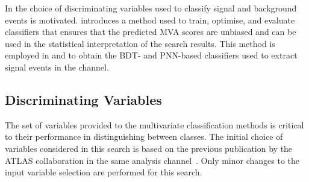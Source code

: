 In  the choice of discriminating
variables used to classify signal and background events is
motivated.  introduces a method used to train,
optimise, and evaluate classifiers that ensures that the predicted MVA scores
are unbiased and can be used in the statistical interpretation of the search
results. This method is employed in  and 
to obtain the BDT- and PNN-based classifiers used to extract signal events in
the \hadhad channel.



\subsection{Discriminating Variables}%
\label{sec:mva_discriminating variables}

The set of variables provided to the multivariate classification
methods is critical to their performance in distinguishing between
classes. The initial choice of variables considered in this search is
based on the previous publication by the ATLAS collaboration in the
same analysis channel~\cite{HIGG-2016-16-witherratum}. Only minor
changes to the input variable selection are performed for this search.

